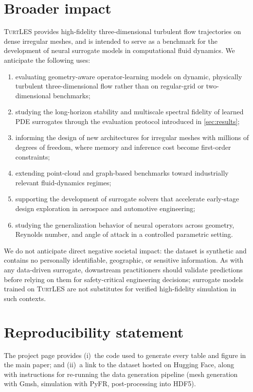 \documentclass{article}
\begin{document}
\section{Broader impact}                                
\label{app:impact}                                     
\textsc{TurtLES} provides high-fidelity three-dimensional turbulent flow trajectories on dense irregular meshes, and is intended to serve as a benchmark for the development of neural surrogate models in computational fluid dynamics. We anticipate the following uses:         
\begin{enumerate} 
      \item evaluating geometry-aware operator-learning models on dynamic, physically turbulent three-dimensional flow rather than on regular-grid or two-dimensional benchmarks;           
      \item studying the long-horizon stability and multiscale spectral fidelity of learned PDE surrogates through the evaluation protocol introduced in \autoref{sec:results};   
      \item informing the design of new architectures for irregular meshes with millions of degrees of freedom, where memory and inference cost become first-order constraints;
      \item extending point-cloud and graph-based benchmarks toward industrially relevant fluid-dynamics regimes;
      \item supporting the development of surrogate solvers that accelerate early-stage design exploration in aerospace and automotive engineering;
      \item studying the generalization behavior of neural operators across geometry, Reynolds number, and angle of attack in a controlled parametric setting.
  \end{enumerate}

We do not anticipate direct negative societal impact: the dataset is synthetic and contains no personally identifiable, geographic, or sensitive information. As with any data-driven surrogate, downstream practitioners should validate predictions before relying on them for safety-critical engineering decisions; surrogate models trained on \textsc{TurtLES} are not substitutes for verified high-fidelity simulation in such contexts.


\section{Reproducibility statement} \label{app:repro}
\textcolor{revcolor}{The project page provides} (i)~the code used to generate every table and figure in the main paper; and (ii)~\textcolor{revcolor}{a link to the dataset hosted on Hugging Face,} along with instructions for re-running the data generation pipeline (mesh generation with Gmsh, simulation with PyFR, post-processing into HDF5).
\end{document}
